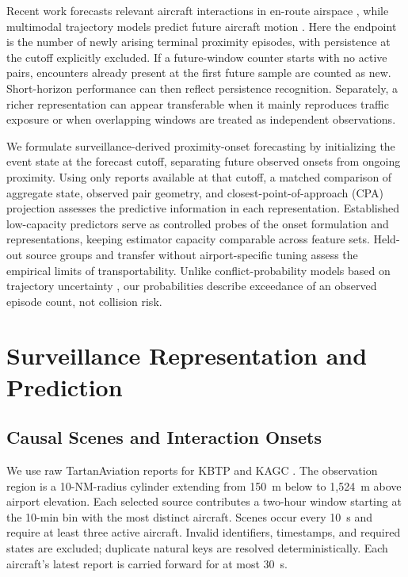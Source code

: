 \documentclass[10pt,journal,letterpaper]{IEEEtran}
\begin{document}
Recent work forecasts relevant aircraft interactions in en-route airspace \cite{henderson2026relevantpairs}, while multimodal trajectory models predict future aircraft motion \cite{prutsch2026ascent}. Here the endpoint is the number of newly arising terminal proximity episodes, with persistence at the cutoff explicitly excluded. If a future-window counter starts with no active pairs, encounters already present at the first future sample are counted as new. Short-horizon performance can then reflect persistence recognition. Separately, a richer representation can appear transferable when it mainly reproduces traffic exposure or when overlapping windows are treated as independent observations.

We formulate surveillance-derived proximity-onset forecasting by initializing the event state at the forecast cutoff, separating future observed onsets from ongoing proximity. Using only reports available at that cutoff, a matched comparison of aggregate state, observed pair geometry, and closest-point-of-approach (CPA) projection assesses the predictive information in each representation. Established low-capacity predictors serve as controlled probes of the onset formulation and representations, keeping estimator capacity comparable across feature sets. Held-out source groups and transfer without airport-specific tuning assess the empirical limits of transportability. Unlike conflict-probability models based on trajectory uncertainty \cite{kuchar2000review}, our probabilities describe exceedance of an observed episode count, not collision risk.

\section{Surveillance Representation and Prediction}
\subsection{Causal Scenes and Interaction Onsets}
We use raw TartanAviation reports for KBTP and KAGC \cite{patrikar2025tartanaviation}. The observation region is a 10-NM-radius cylinder extending from 150~m below to 1,524~m above airport elevation. Each selected source contributes a two-hour window starting at the 10-min bin with the most distinct aircraft. Scenes occur every 10~s and require at least three active aircraft. Invalid identifiers, timestamps, and required states are excluded; duplicate natural keys are resolved deterministically. Each aircraft's latest report is carried forward for at most 30~s.
\end{document}
